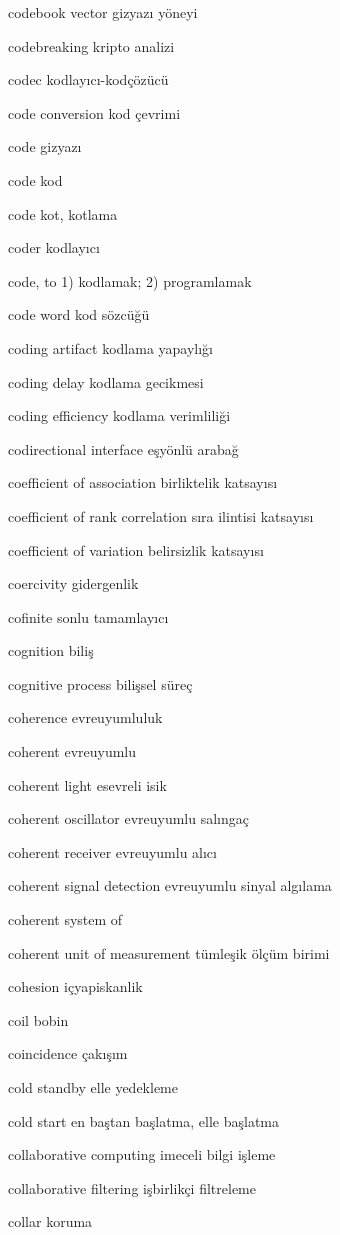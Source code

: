 \documentclass[12pt,fleqn]{article}\usepackage{../../common}
\begin{document}
codebook vector gizyazı yöneyi

codebreaking kripto analizi

codec kodlayıcı-kodçözücü

code conversion kod çevrimi

code gizyazı

code kod

code kot, kotlama

coder kodlayıcı

code, to 1) kodlamak; 2) programlamak

code word kod sözcüğü

coding artifact kodlama yapaylığı

coding delay kodlama gecikmesi

coding efficiency kodlama verimliliği

codirectional interface eşyönlü arabağ

coefficient of association birliktelik katsayısı

coefficient of rank correlation sıra ilintisi katsayısı

coefficient of variation belirsizlik katsayısı

coercivity gidergenlik

cofinite sonlu tamamlayıcı

cognition biliş

cognitive process bilişsel süreç

coherence evreuyumluluk

coherent evreuyumlu

coherent light esevreli isik

coherent oscillator evreuyumlu salıngaç

coherent receiver evreuyumlu alıcı

coherent signal detection evreuyumlu sinyal algılama

coherent system of

coherent unit of measurement tümleşik ölçüm birimi

cohesion içyapiskanlik

coil bobin

coincidence çakışım

cold standby elle yedekleme

cold start en baştan başlatma, elle başlatma

collaborative computing imeceli bilgi işleme

collaborative filtering işbirlikçi filtreleme

collar koruma
\end{document}
